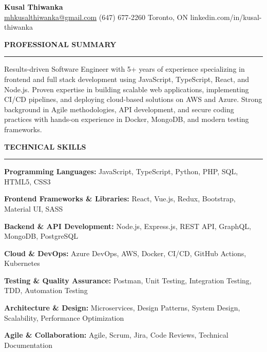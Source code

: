 \documentclass[10pt,letterpaper]{article}
\begin{document}
\begin{center}
{\LARGE\textbf{Kusal Thiwanka}}\\[3pt]
\href{mailto:mhkusalthiwanka@gmail.com}{mhkusalthiwanka@gmail.com}\hspace{2em}%
(647) 677{-}2260\hspace{2em}%
Toronto, ON\hspace{2em}
linkedin.com/in/kusal-thiwanka
\end{center}

\vspace{6pt}

\textbf{PROFESSIONAL SUMMARY}\\[-8pt]
\noindent\rule{\textwidth}{1pt}

\vspace{-2pt}

Results-driven Software Engineer with 5+ years of experience specializing in frontend and full stack development using JavaScript, TypeScript, React, and Node.js. Proven expertise in building scalable web applications, implementing CI/CD pipelines, and deploying cloud-based solutions on AWS and Azure. Strong background in Agile methodologies, API development, and secure coding practices with hands-on experience in Docker, MongoDB, and modern testing frameworks.

\vspace{8pt}

\textbf{TECHNICAL SKILLS}\\[-8pt]
\noindent\rule{\textwidth}{1pt}

\vspace{-2pt}

\textbf{Programming Languages:} JavaScript, TypeScript, Python, PHP, SQL, HTML5, CSS3

\textbf{Frontend Frameworks \& Libraries:} React, Vue.js, Redux, Bootstrap, Material UI, SASS

\textbf{Backend \& API Development:} Node.js, Express.js, REST API, GraphQL, MongoDB, PostgreSQL

\textbf{Cloud \& DevOps:} Azure DevOps, AWS, Docker, CI/CD, GitHub Actions, Kubernetes

\textbf{Testing \& Quality Assurance:} Postman, Unit Testing, Integration Testing, TDD, Automation Testing

\textbf{Architecture \& Design:} Microservices, Design Patterns, System Design, Scalability, Performance Optimization

\textbf{Agile \& Collaboration:} Agile, Scrum, Jira, Code Reviews, Technical Documentation
\end{document}
